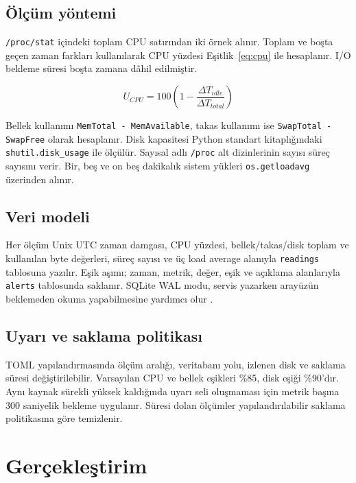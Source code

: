\documentclass[9pt,a4paper,twocolumn]{extarticle}
\begin{document}
\subsection{Ölçüm yöntemi}

\texttt{/proc/stat} içindeki toplam CPU satırından iki örnek alınır. Toplam ve boşta geçen zaman farkları kullanılarak CPU yüzdesi Eşitlik~\ref{eq:cpu} ile hesaplanır. I/O bekleme süresi boşta zamana dâhil edilmiştir.

\begin{equation}
U_{CPU}=100\left(1-\frac{\Delta T_{idle}}{\Delta T_{total}}\right)
\label{eq:cpu}
\end{equation}

Bellek kullanımı \texttt{MemTotal - MemAvailable}, takas kullanımı ise \texttt{SwapTotal - SwapFree} olarak hesaplanır. Disk kapasitesi Python standart kitaplığındaki \texttt{shutil.disk\_usage} ile ölçülür. Sayısal adlı \texttt{/proc} alt dizinlerinin sayısı süreç sayısını verir. Bir, beş ve on beş dakikalık sistem yükleri \texttt{os.getloadavg} üzerinden alınır.

\subsection{Veri modeli}

Her ölçüm Unix UTC zaman damgası, CPU yüzdesi, bellek/takas/disk toplam ve kullanılan byte değerleri, süreç sayısı ve üç load average alanıyla \texttt{readings} tablosuna yazılır. Eşik aşımı; zaman, metrik, değer, eşik ve açıklama alanlarıyla \texttt{alerts} tablosunda saklanır. SQLite WAL modu, servis yazarken arayüzün beklemeden okuma yapabilmesine yardımcı olur \cite{sqlitewal}.

\subsection{Uyarı ve saklama politikası}

TOML yapılandırmasında ölçüm aralığı, veritabanı yolu, izlenen disk ve saklama süresi değiştirilebilir. Varsayılan CPU ve bellek eşikleri \%85, disk eşiği \%90'dır. Aynı kaynak sürekli yüksek kaldığında uyarı seli oluşmaması için metrik başına 300 saniyelik bekleme uygulanır. Süresi dolan ölçümler yapılandırılabilir saklama politikasına göre temizlenir.

\section{Gerçekleştirim}
\end{document}
